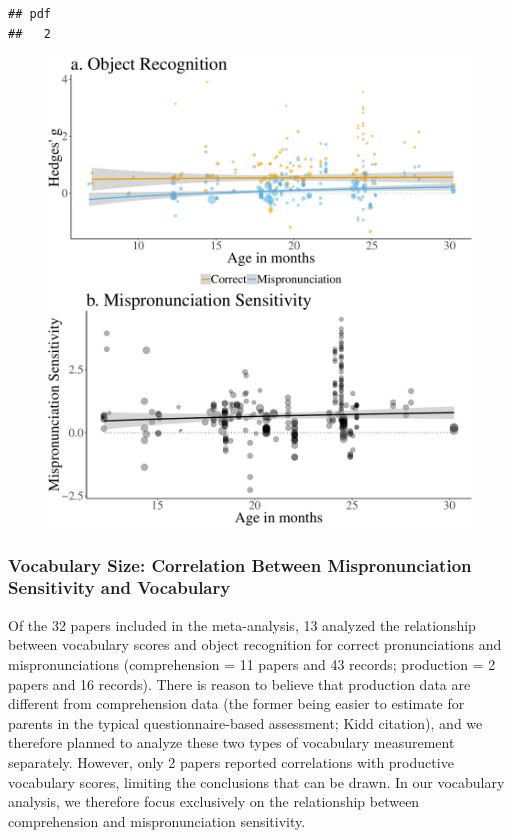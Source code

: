 \documentclass[man]{apa6}
\theoremstyle{definition}
\theoremstyle{definition}
\theoremstyle{definition}
\theoremstyle{remark}
\begin{document}
\begin{verbatim}
## pdf 
##   2
\end{verbatim}

\begin{figure}
\centering
\includegraphics{Paper_Analyses_files/figure-latex/PlotMPEffect-1.pdf}
\caption{}
\end{figure}

\subsubsection{Vocabulary Size: Correlation Between Mispronunciation
Sensitivity and
Vocabulary}\label{vocabulary-size-correlation-between-mispronunciation-sensitivity-and-vocabulary}

Of the 32 papers included in the meta-analysis, 13 analyzed the
relationship between vocabulary scores and object recognition for
correct pronunciations and mispronunciations (comprehension = 11 papers
and 43 records; production = 2 papers and 16 records). There is reason
to believe that production data are different from comprehension data
(the former being easier to estimate for parents in the typical
questionnaire-based assessment; Kidd citation), and we therefore planned
to analyze these two types of vocabulary measurement separately.
However, only 2 papers reported correlations with productive vocabulary
scores, limiting the conclusions that can be drawn. In our vocabulary
analysis, we therefore focus exclusively on the relationship between
comprehension and mispronunciation sensitivity.
\end{document}
